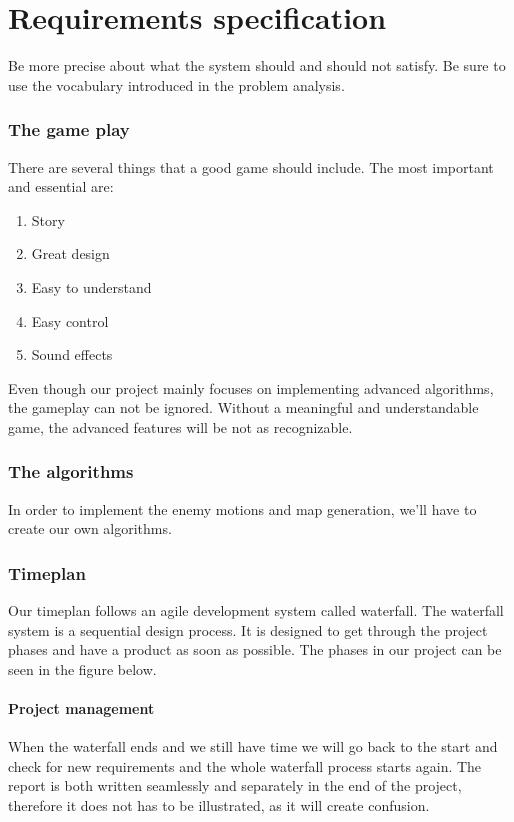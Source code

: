 \chapter{Requirements specification}

Be more precise about what the system should and should not satisfy.
Be sure to use the vocabulary introduced in the problem analysis.

\subsection{The game play}
There are several things that a good game should include. The most important
and essential are:

\begin{enumerate}
\item Story
\item Great design
\item Easy to understand
\item Easy control
\item Sound effects
\end{enumerate}

Even though our project mainly focuses on implementing advanced algorithms, the gameplay
can not be ignored. Without a meaningful and understandable game, the advanced features will
be not as recognizable.

\subsection{The algorithms}
In order to implement the enemy motions and map generation, we'll have to create our
own algorithms.



\subsection{Timeplan}
Our timeplan follows an agile development system called waterfall.
The waterfall system is a sequential design process.
It is designed to get through the project phases and have a product as soon as
possible. The phases in our project can be seen in the figure below.

\subsubsection{Project management}
When the waterfall ends and we still have time
we will go back to the start and check for new requirements
and the whole waterfall process starts again.
The report is both written seamlessly and separately in the end of the project,
therefore it does not has to be illustrated, as it will create confusion.

